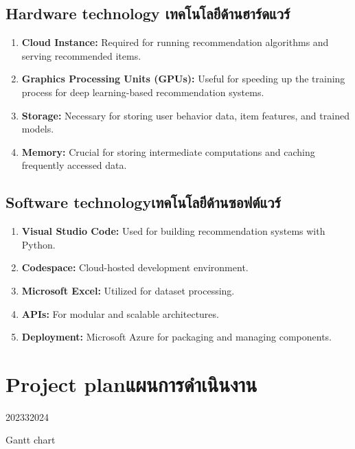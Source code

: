 \subsection{\ifenglish Hardware technology \else เทคโนโลยีด้านฮาร์ดแวร์ \fi}

\begin{enumerate}
    \item \textsf{\textbf{Cloud Instance:} Required for running recommendation algorithms and serving recommended items.}
    \item \textsf{\textbf{Graphics Processing Units (GPUs):} Useful for speeding up the training process 
    for deep learning-based recommendation systems.}
    \item \textsf{\textbf{Storage:} Necessary for storing user behavior data, item features, and trained models.}
    \item \textsf{\textbf{Memory:} Crucial for storing intermediate computations and caching frequently accessed data.}
\end{enumerate}

\subsection{\ifenglish Software technology\else เทคโนโลยีด้านซอฟต์แวร์\fi}

\begin{enumerate}
    \item \textsf{\textbf{Visual Studio Code:} Used for building recommendation systems with Python.}
    \item \textsf{\textbf{Codespace:} Cloud-hosted development environment.}
    \item \textsf{\textbf{Microsoft Excel:} Utilized for dataset processing.}
    \item \textsf{\textbf{APIs:} For modular and scalable architectures.}
    \item \textsf{\textbf{Deployment:} Microsoft Azure for packaging and managing components.}
\end{enumerate}

\section{\ifenglish Project plan\else แผนการดำเนินงาน\fi}

\begin{table}[H]
\begin{plan}{6}{2023}{3}{2024}
\end{plan}
\caption{Gantt chart}
\end{table}

